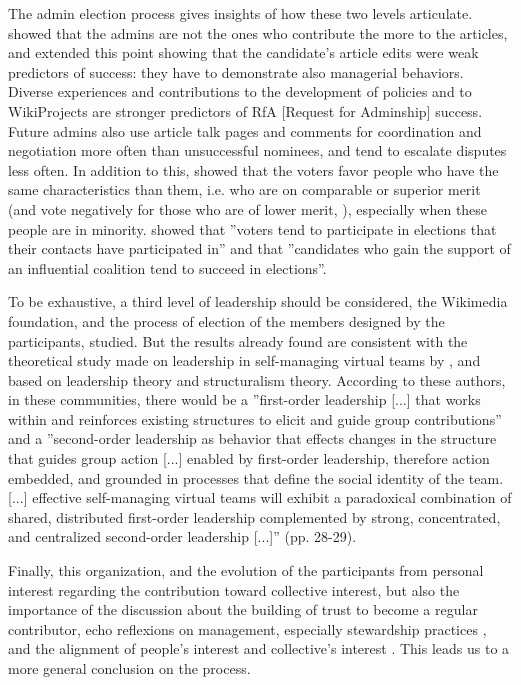 The admin election process gives insights of how these two levels
articulate. \citet{Ortega07} showed that the admins are not the ones
who contribute the more to the articles, and \citet{BurkeKraut08}
extended this point showing that the candidate\textquoteright s article
edits were weak predictors of success: they have to demonstrate also
managerial behaviors. Diverse experiences and contributions to the
development of policies and to WikiProjects are stronger predictors
of RfA {[}Request for Adminship{]} success. Future admins also use
article talk pages and comments for coordination and negotiation more
often than unsuccessful nominees, and tend to escalate disputes less
often. In addition to this, \citet{LeskovecHuttenlocherKleinberg10}
showed that the voters favor people who have the same characteristics
than them, i.e. who are on comparable or superior merit (and vote
negatively for those who are of lower merit, \citealt{LeskovecHuttenlocherKleinberg10b}),
especially when these people are in minority. \citet{CabunducanCastilloLee11}
showed that ''voters tend to participate in elections that their
contacts have participated in'' and that ''candidates who gain the
support of an influential coalition tend to succeed in elections''. 

To be exhaustive, a third level of leadership should be considered,
the Wikimedia foundation, and the process of election of the members
designed by the participants, studied. But the results already found
are consistent with the theoretical study made on leadership in self-managing
virtual teams by \citet{CrowstonHeckmanMisiolek10}, and based on
leadership theory and structuralism theory. According to these authors,
in these communities, there would be a ''first-order leadership {[}...{]}
that works within and reinforces existing structures to elicit and
guide group contributions'' and a ''second-order leadership as behavior
that effects changes in the structure that guides group action {[}...{]}
enabled by first-order leadership, therefore action embedded, and
grounded in processes that define the social identity of the team.
{[}...{]} effective self-managing virtual teams will exhibit a paradoxical
combination of shared, distributed first-order leadership complemented
by strong, concentrated, and centralized second-order leadership {[}...{]}''
(pp. 28-29).

Finally, this organization, and the evolution of the participants
from personal interest regarding the contribution toward collective
interest, but also the importance of the discussion about the building
of trust to become a regular contributor, echo reflexions on management,
especially stewardship practices \citep{DavisSchoormanDonaldson97},
and the alignment of people's interest and collective's interest \citep{Hernandez12}.
This leads us to a more general conclusion on the process.